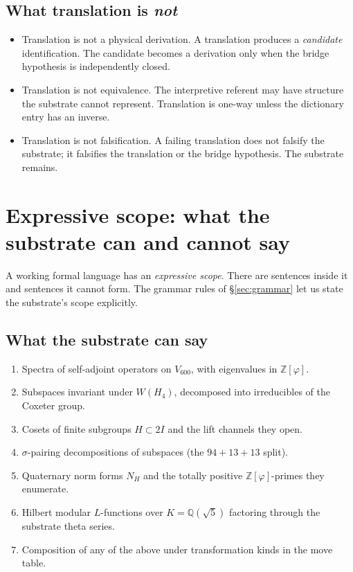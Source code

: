 \documentclass[11pt,a4paper]{article}
\newcommand{\Vsix}{V_{600}}
\newcommand{\NH}{N_H}
\newcommand{\Q}{\mathbb{Q}}
\newcommand{\Z}{\mathbb{Z}}
\begin{document}
\subsection{What translation is \emph{not}}

\begin{itemize}[leftmargin=*]
  \item Translation is not a physical derivation. A translation
        produces a \emph{candidate} identification. The candidate
        becomes a derivation only when the bridge hypothesis is
        independently closed.
  \item Translation is not equivalence. The interpretive referent
        may have structure the substrate cannot represent.
        Translation is one-way unless the dictionary entry has an
        inverse.
  \item Translation is not falsification. A failing translation
        does not falsify the substrate; it falsifies the
        translation or the bridge hypothesis. The substrate
        remains.
\end{itemize}

\section{Expressive scope: what the substrate can and cannot say}
\label{sec:scope}

A working formal language has an \emph{expressive scope}. There are
sentences inside it and sentences it cannot form. The grammar rules
of \S\ref{sec:grammar} let us state the substrate's scope
explicitly.

\subsection{What the substrate can say}

\begin{enumerate}[leftmargin=*]
  \item Spectra of self-adjoint operators on $\Vsix$, with
        eigenvalues in $\Z[\varphi]$.
  \item Subspaces invariant under $W(H_4)$, decomposed into
        irreducibles of the Coxeter group.
  \item Cosets of finite subgroups $H \subset 2I$ and the lift
        channels they open.
  \item $\sigma$-pairing decompositions of subspaces (the
        $94 + 13 + 13$ split).
  \item Quaternary norm forms $\NH$ and the totally positive
        $\Z[\varphi]$-primes they enumerate.
  \item Hilbert modular $L$-functions over $K = \Q(\sqrt 5)$
        factoring through the substrate theta series.
  \item Composition of any of the above under transformation
        kinds in the move table.
\end{enumerate}
\end{document}
